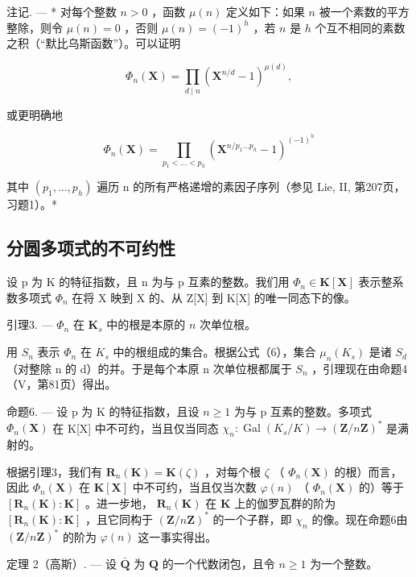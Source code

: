 注记. --- * 对每个整数 \(n>0\) ，函数 \(\mu(n)\) 定义如下：如果 \(n\) 被一个素数的平方整除，则令 \(\mu(n)=0\) ，否则 \(\mu(n)=(-1)^{h}\) ，若 \(n\) 是 \(h\) 个互不相同的素数之积（“默比乌斯函数”）。可以证明

\[
\Phi_ {n} (\mathbf {X}) = \prod_ {d \mid n} \left(\mathbf {X} ^ {n / d} - 1\right) ^ {\mu (d)},\tag{8}
\]

或更明确地

\[
\Phi_ {n} (\mathbf {X}) = \prod_ {p _ {1} <   \dots <   p _ {h}} \left(\mathbf {X} ^ {n / p _ {1} \dots p _ {h}} - 1\right) ^ {(- 1) ^ {h}}\tag{9}
\]

其中 \((p_{1},\ldots,p_{h})\) 遍历 n 的所有严格递增的素因子序列（参见 Lie, II, 第207页，习题1）。*

\subsection{分圆多项式的不可约性}

设 p 为 K 的特征指数，且 n 为与 p 互素的整数。我们用 \(\Phi_{n} \in \mathbf{K}[\mathbf{X}]\) 表示整系数多项式 \(\Phi_{n}\) 在将 X 映到 X 的、从 Z{[}X{]} 到 K{[}X{]} 的唯一同态下的像。

引理3. --- \(\Phi_n\) 在 \(\mathbf{K}_s\) 中的根是本原的 \(n\) 次单位根。

用 \(S_{n}\) 表示 \(\Phi_{n}\) 在 \(K_{s}\) 中的根组成的集合。根据公式（6），集合 \(\mu_{n}(K_{s})\) 是诸 \(S_{d}\) （对整除 n 的 d）的并。于是每个本原 n 次单位根都属于 \(S_{n}\) ，引理现在由命题4（V，第81页）得出。

命题6. --- 设 p 为 K 的特征指数，且设 \(n \geqslant 1\) 为与 p 互素的整数。多项式 \(\Phi_{n}(\mathbf{X})\) 在 K{[}X{]} 中不可约，当且仅当同态 \(\chi_{n}: \operatorname{Gal}(K_{s}/K) \to (\mathbf{Z}/n\mathbf{Z})^{*}\) 是满射的。

根据引理3，我们有 \(\mathbf{R}_n(\mathbf{K}) = \mathbf{K}(\zeta)\) ，对每个根 \(\zeta\) （ \(\Phi_n(\mathbf{X})\) 的根）而言，因此 \(\Phi_n(\mathbf{X})\) 在 \(\mathbf{K}[\mathbf{X}]\) 中不可约，当且仅当次数 \(\varphi(n)\) （ \(\Phi_n(\mathbf{X})\) 的）等于 \([\mathbf{R}_n(\mathbf{K}) : \mathbf{K}]\) 。进一步地， \(\mathbf{R}_n(\mathbf{K})\) 在 \(\mathbf{K}\) 上的伽罗瓦群的阶为 \([\mathbf{R}_n(\mathbf{K}) : \mathbf{K}]\) ，且它同构于 \((\mathbf{Z}/n\mathbf{Z})^*\) 的一个子群，即 \(\chi_n\) 的像。现在命题6由 \((\mathbf{Z}/n\mathbf{Z})^*\) 的阶为 \(\varphi(n)\) 这一事实得出。

定理 2（高斯）. --- 设 \(\bar{\mathbf{Q}}\) 为 \(\mathbf{Q}\) 的一个代数闭包，且令 \(n \geqslant 1\) 为一个整数。

